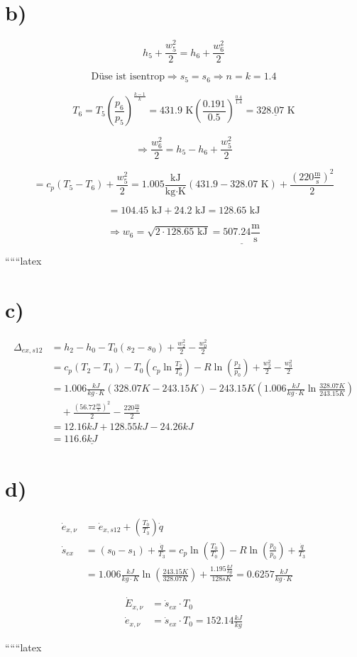 \section*{b)}

\[
h_5 + \frac{w_5^2}{2} = h_6 + \frac{w_6^2}{2}
\]

\[
\text{Düse ist isentrop} \Rightarrow s_5 = s_6 \Rightarrow n = k = 1.4
\]

\[
T_6 = T_5 \left( \frac{p_6}{p_5} \right)^{\frac{k-1}{k}} = 431.9 \text{ K} \left( \frac{0.191}{0.5} \right)^{\frac{0.4}{1.4}} = \underline{328.07 \text{ K}}
\]

\[
\Rightarrow \frac{w_6^2}{2} = h_5 - h_6 + \frac{w_5^2}{2}
\]

\[
= c_p \left( T_5 - T_6 \right) + \frac{w_5^2}{2} = 1.005 \frac{\text{kJ}}{\text{kg} \cdot \text{K}} \left( 431.9 - 328.07 \text{ K} \right) + \frac{(220 \frac{\text{m}}{\text{s}})^2}{2}
\]

\[
= 104.45 \text{ kJ} + 24.2 \text{ kJ} = 128.65 \text{ kJ}
\]

\[
\Rightarrow w_6 = \sqrt{2 \cdot 128.65 \text{ kJ}} = \underline{507.24 \frac{\text{m}}{\text{s}}}
\]

``````latex


\section*{c)}

\begin{align*}
\Delta_{ex, s12} &= h_2 - h_0 - T_0 (s_2 - s_0) + \frac{w_2^2}{2} - \frac{w_0^2}{2} \\
&= c_p (T_2 - T_0) - T_0 \left( c_p \ln \frac{T_2}{T_0} \right) - R \ln \left( \frac{p_2}{p_0} \right) + \frac{w_2^2}{2} - \frac{w_0^2}{2} \\
&= 1.006 \frac{kJ}{kg \cdot K} \left( 328.07 K - 243.15 K \right) - 243.15 K \left( 1.006 \frac{kJ}{kg \cdot K} \ln \frac{328.07 K}{243.15 K} \right) \\
&\quad + \frac{(56.72 \frac{m}{s})^2}{2} - \frac{220 \frac{m}{s}}{2} \\
&= 12.16 kJ + 128.55 kJ - 24.26 kJ \\
&= 116.6 \underline{kJ}
\end{align*}

\section*{d)}

\begin{align*}
\dot{e}_{x, \nu} &= \dot{e}_{x, s12} + \left( \frac{T_0}{T_3} \right) \dot{q} \\
\dot{s}_{ex} &= (s_0 - s_1) + \frac{\dot{q}}{T_3} = c_p \ln \left( \frac{T_0}{T_0} \right) - R \ln \left( \frac{p_0}{p_0} \right) + \frac{\dot{q}}{T_3} \\
&= 1.006 \frac{kJ}{kg \cdot K} \ln \left( \frac{243.15 K}{328.07 K} \right) + \frac{1.195 \frac{kJ}{kg}}{128 sK} = 0.6257 \frac{kJ}{kg \cdot K}
\end{align*}

\begin{align*}
\dot{E}_{x, \nu} &= \dot{s}_{ex} \cdot T_0 \\
\dot{e}_{x, \nu} &= \dot{s}_{ex} \cdot T_0 = 152.14 \frac{kJ}{kg}
\end{align*}

``````latex


